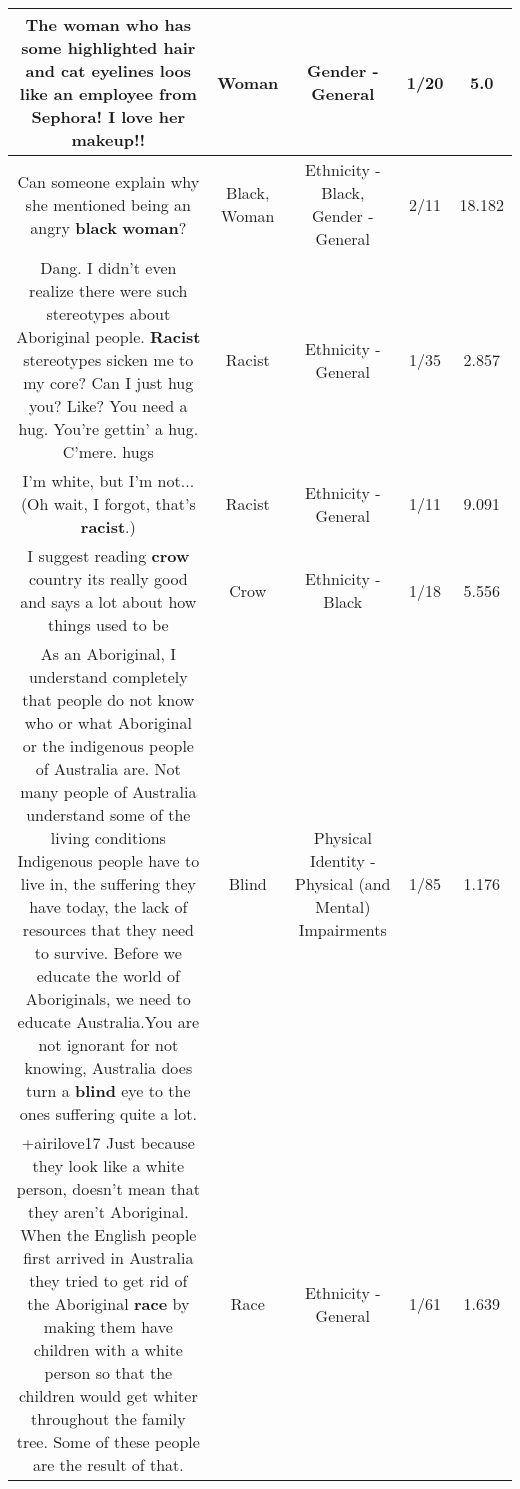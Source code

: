 \documentclass[11pt]{article}
\newlength\mylength
\begin{document}
\begin{center}
\begin{longtable}{|C{.65\mylength}|C{.30\mylength}|C{.12\mylength}|C{.12\mylength}|C{.12\mylength}|}
  \small The \textbf{woman} who has some highlighted hair and cat eyelines loos like an employee from Sephora!  I love her makeup!!\normalsize   & Woman & Gender - General & 1/20 & 5.0 \\  \hline
  \small Can someone explain why she mentioned being an angry \textbf{black} \textbf{woman}?\normalsize   & Black, Woman & Ethnicity - Black, Gender - General & 2/11 & 18.182 \\  \hline
  \small Dang. I didn't even realize there were such stereotypes about Aboriginal people. \textbf{Racist} stereotypes sicken me to my core? Can I just hug you? Like? You need a hug. You're gettin' a hug. C'mere. hugs\normalsize   & Racist & Ethnicity - General & 1/35 & 2.857 \\  \hline
  \small I'm white, but I'm not...(Oh wait, I forgot, that's \textbf{racist}.)\normalsize   & Racist & Ethnicity - General & 1/11 & 9.091 \\  \hline
  \small I suggest reading \textbf{crow} country its really good and says a lot about how things used to be\normalsize   & Crow & Ethnicity - Black & 1/18 & 5.556 \\  \hline
  \small As an Aboriginal, I understand completely that people do not know who or what Aboriginal or the indigenous people of Australia are. Not many people of Australia understand some of the living conditions Indigenous people have to live in, the suffering they have today, the lack of resources that they need to survive. Before we educate the world of Aboriginals, we need to educate Australia.You are not ignorant for not knowing, Australia does turn a \textbf{blind} eye to the ones suffering quite a lot.\normalsize   & Blind & Physical Identity - Physical (and Mental) Impairments & 1/85 & 1.176 \\  \hline
  \small +airilove17 Just because they look like a white person, doesn't mean that they aren't Aboriginal. When the English people first arrived in Australia they tried to get rid of the Aboriginal \textbf{race} by making them have children with a white person so that the children would get whiter throughout the family tree. Some of these people are the result of that.\normalsize   & Race & Ethnicity - General & 1/61 & 1.639 \\  \hline

\end{longtable}
\end{center}
\end{document}
